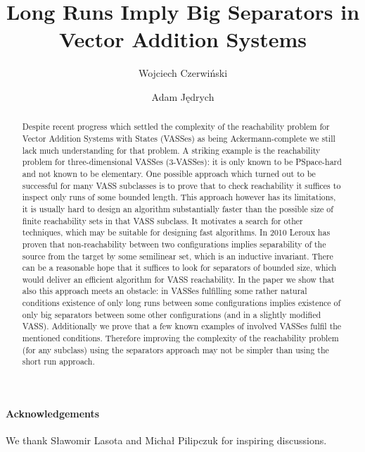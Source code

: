 \documentclass[a4paper,UKenglish]{lipics-v2021}
\title{Long Runs Imply Big Separators in Vector Addition Systems}
\author{Wojciech Czerwi\'nski}{University of Warsaw}{wczerwin@mimuw.edu.pl}{0000-0002-6169-868X}{Supported by the ERC grant INFSYS, agreement no. 950398.}
\author{Adam J\k{e}drych}{University of Warsaw}{aj370982@students.mimuw.edu.pl}{}{}
\begin{document}
\maketitle

\nolinenumbers

\begin{abstract}
Despite recent progress which settled the complexity of the reachability problem for Vector Addition Systems with States (VASSes)
as being Ackermann-complete we still lack much understanding for that problem.
A striking example is the reachability problem for three-dimensional
VASSes (3-VASSes): it is only known to be PSpace-hard and not known to be elementary.
One possible approach which turned out to be successful for many VASS subclasses is to prove that to check reachability it suffices to inspect only runs of some bounded length. This approach however has its limitations, it is usually hard to design an algorithm
substantially faster than the possible size of finite reachability sets in that VASS subclass. It motivates a search for other
techniques, which may be suitable for designing fast algorithms.
In 2010 Leroux has proven that non-reachability between two configurations implies separability of the source from the target
by some semilinear set, which is an inductive invariant. There can be a reasonable hope that it suffices to look for separators
of bounded size, which would deliver an efficient algorithm for VASS reachability. In the paper we show that
also this approach meets an obstacle: in VASSes fulfilling some rather natural conditions
existence of only long runs between some configurations implies
existence of only big separators between some other configurations (and in a slightly modified VASS). Additionally
we prove that a few known examples of involved VASSes fulfil the mentioned conditions. Therefore improving the complexity of the
reachability problem (for any subclass) using the separators approach may not be simpler than using the short run approach.
\end{abstract}








\paragraph*{Acknowledgements}
We thank S{\l}awomir Lasota and Michał Pilipczuk for inspiring discussions.




\appendix


\end{document}
